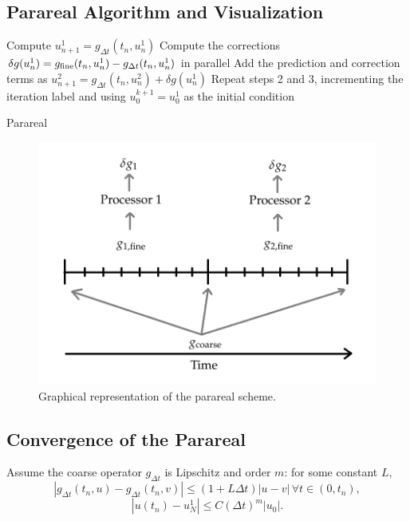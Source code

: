 \documentclass[letterpaper,12pt]{article}
\begin{document}
\subsection{Parareal Algorithm and Visualization}

\begin{algorithm}
    Compute $u^1_{n+1} = g_{\Delta t}(t_n, u^1_n)$\;
    Compute the corrections $\delta g(u^1_n) = g_{\textnormal{fine}}(t_n,
    u^1_n) - g_{\Delta t}(t_n, u^1_n)$ in parallel\;
    Add the prediction and correction terms as $u^2_{n+1} = g_{\Delta t}(t_n,
    u^2_n) + \delta g(u^1_n)$\;
    Repeat steps 2 and 3, incrementing the iteration label and using $u^{k+1}_0
    = u^1_0$ as the initial condition\;
 \caption{Parareal}
 \label{alg:parareal}
\end{algorithm}

\begin{figure}[H]
\begin{center}
\includegraphics[width=0.75\linewidth]{parareal_visualization.png}
\caption{Graphical representation of the parareal scheme.}
\label{fig:pararealvis}
\end{center}
\end{figure}

\subsection{Convergence of the Parareal}

Assume the coarse operator $g_{\Delta t}$ is Lipschitz and order $m$: for some
constant $L$, 
\[ |g_{\Delta t}(t_n, u) - g_{\Delta t}(t_n, v)| \leq (1 + L \Delta t) |u - v|
\, \forall t \in (0, t_n), \]
\[ |u(t_n) - u^1_N | \leq C(\Delta t)^m |u_0|. \]
\end{document}
